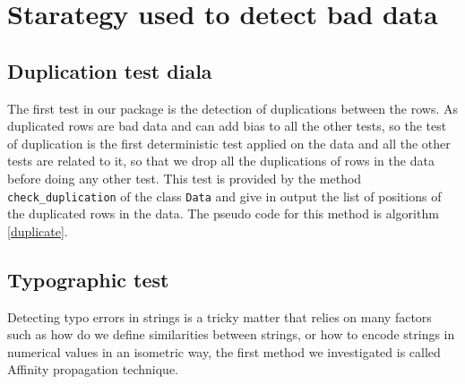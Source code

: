 \documentclass{article}
\begin{document}
\section{Starategy used to detect bad data}
\label{sec:Starategy used to detect bad data}


\subsection{Duplication test diala} %
\label{sub:Duplication test}
The first test in our package is the detection of duplications between the rows.  As duplicated rows are bad data and can add bias to all the other tests, so the test of duplication is the first deterministic test applied on the data and all the other tests are related to it, so that we drop all the duplications of rows in the data before doing any other test. This test is provided by the method \texttt{check\_duplication} of the class \texttt{Data} and give in output the list of positions of the duplicated rows in the data. The pseudo code for this method is algorithm \ref{duplicate}.



\subsection{Typographic test} %
\label{sub:Typographic test}
Detecting typo errors in strings is a tricky matter that relies on many factors such as how do we define similarities between strings, or how to encode strings in numerical values in an isometric way, the first method we investigated is called Affinity propagation technique.
\end{document}
